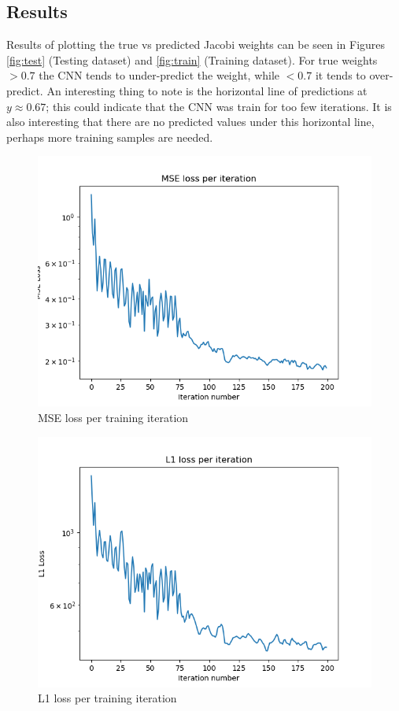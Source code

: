 \subsection{Results}

Results of plotting the true vs predicted Jacobi weights can be seen in Figures \ref{fig:test} (Testing dataset) and \ref{fig:train} (Training dataset).  For true weights $>0.7$ the CNN tends to under-predict the weight, while $<0.7$ it tends to over-predict.  An interesting thing to note is the horizontal line of predictions at $y\approx0.67$; this could indicate that the CNN was train for too few iterations.  It is also interesting that there are no predicted values under this horizontal line, perhaps more training samples are needed.


\begin{figure}[h]
  \centering
  \includegraphics[scale=0.7]{figures/10-16-20-mse-loss.png}
  \caption{MSE loss per training iteration}
  \label{fig:mse}
\end{figure}

\begin{figure}[h]
  \centering
  \includegraphics[scale=0.7]{figures/10-16-20-l1-loss.png}
  \caption{L1 loss per training iteration}
  \label{fig:l1}
\end{figure}

